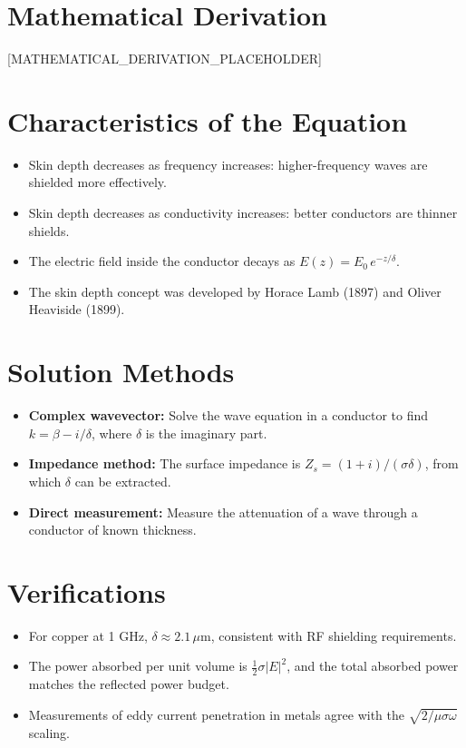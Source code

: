 \documentclass[11pt,openright]{book}
\begin{document}
\section*{Mathematical Derivation}

[MATHEMATICAL_DERIVATION_PLACEHOLDER]

\section*{Characteristics of the Equation}

\begin{itemize}
    \item Skin depth decreases as frequency increases: higher-frequency waves are shielded more effectively.
    \item Skin depth decreases as conductivity increases: better conductors are thinner shields.
    \item The electric field inside the conductor decays as $E(z) = E_0\,e^{-z/\delta}$.
    \item The skin depth concept was developed by Horace Lamb (1897) and Oliver Heaviside (1899).
\end{itemize}
\section*{Solution Methods}

\begin{itemize}
    \item \textbf{Complex wavevector:} Solve the wave equation in a conductor to find $k = \beta - i/\delta$, where $\delta$ is the imaginary part.
    \item \textbf{Impedance method:} The surface impedance is $Z_s = (1+i)/(\sigma\delta)$, from which $\delta$ can be extracted.
    \item \textbf{Direct measurement:} Measure the attenuation of a wave through a conductor of known thickness.
\end{itemize}
\section*{Verifications}

\begin{itemize}
    \item For copper at 1 GHz, $\delta \approx 2.1\,\mu$m, consistent with RF shielding requirements.
    \item The power absorbed per unit volume is $\frac{1}{2}\sigma|E|^2$, and the total absorbed power matches the reflected power budget.
    \item Measurements of eddy current penetration in metals agree with the $\sqrt{2/\mu\sigma\omega}$ scaling.
\end{itemize}
\end{document}

